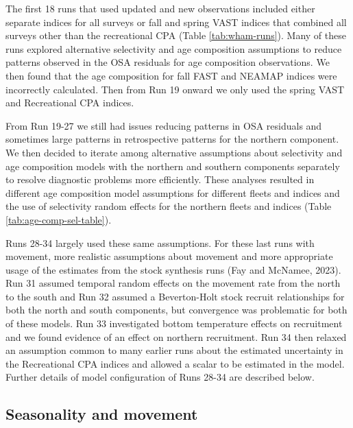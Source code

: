\documentclass[
]{article}
\begin{document}
The first 18 runs that used updated and new observations included either separate indices for all surveys or fall and spring VAST indices that combined all surveys other than the recreational CPA (Table \ref{tab:wham-runs}). Many of these runs explored alternative selectivity and age composition assumptions to reduce patterns observed in the OSA residuals for age composition observations. We then found that the age composition for fall FAST and NEAMAP indices were incorrectly calculated. Then from Run 19 onward we only used the spring VAST and Recreational CPA indices.

From Run 19-27 we still had issues reducing patterns in OSA residuals and sometimes large patterns in retrospective patterns for the northern component. We then decided to iterate among alternative assumptions about selectivity and age composition models with the northern and southern components separately to resolve diagnostic problems more efficiently. These analyses resulted in different age composition model assumptions for different fleets and indices and the use of selectivity random effects for the northern fleets and indices (Table \ref{tab:age-comp-sel-table}).

Runs 28-34 largely used these same assumptions. For these last runs with movement, more realistic assumptions about movement and more appropriate usage of the estimates from the stock synthesis runs (Fay and McNamee, 2023). Run 31 assumed temporal random effects on the movement rate from the north to the south and Run 32 assumed a Beverton-Holt stock recruit relationships for both the north and south components, but convergence was problematic for both of these models. Run 33 investigated bottom temperature effects on recruitment and we found evidence of an effect on northern recruitment. Run 34 then relaxed an assumption common to many earlier runs about the estimated uncertainty in the Recreational CPA indices and allowed a scalar to be estimated in the model. Further details of model configuration of Runs 28-34 are described below.

\hypertarget{seasonality-and-movement}{%
\subsection{Seasonality and movement}\label{seasonality-and-movement}}
\end{document}

